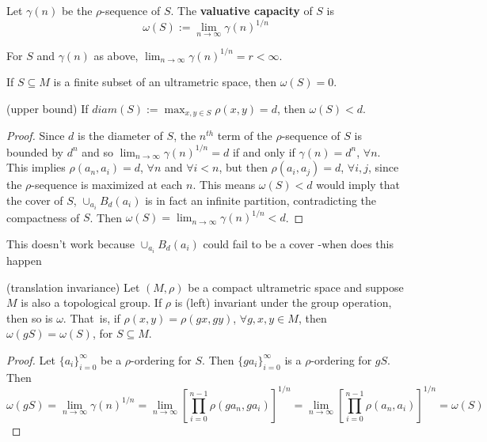 \begin{definition*}
	\cite{kj}  Let $\gamma(n)$ be the $\rho$-sequence of $S$. The \textbf{valuative capacity} of $S$ is \[\omega(S)
	:= \lim_{n\to\infty} \gamma(n)^{1/n}\]  
\end{definition*}


\begin{proposition*}
	\cite{kj} For $S$ and $\gamma(n)$ as above,  $\lim_{n\to\infty} \gamma(n)^{1/n} = r < \infty$. 
\end{proposition*}


\begin{proposition*}
	If $S \subseteq M$ is a finite subset of an ultrametric space, then $\omega(S) =0$.
\end{proposition*}


\begin{proposition*}
	(upper bound) If $diam(S)  := \max_{x,y \in S} \rho(x,y)= d$, then $\omega(S) < d$.
\end{proposition*}

\begin{proof}
	Since $d$ is the diameter of $S$, the $n^{th}$ term of the $\rho$-sequence of $S$ is bounded by $d^n$ and so $ \lim_{n\to\infty} \gamma(n)^{1/n}=d$ if and only if $\gamma(n)=d^n$, $\forall n$. This implies $\rho(a_n, a_i) = d$, $\forall n$ and $\forall i < n$, but then $\rho(a_i,a_j)=d$, $\forall i,j$, since the $\rho$-sequence is maximized at each $n$. This means $\omega(S) < d$ would imply that the cover of $S$, $\cup_{a_i} B_d(a_i)$ is in fact an infinite partition, contradicting the compactness of $S$. Then  $\omega(S)= \lim_{n\to\infty} \gamma(n)^{1/n}<d$. 
\end{proof}

This doesn't work because  $\cup_{a_i} B_d(a_i)$  could fail to be a cover -when does this happen


\begin{proposition*}
	(translation invariance) Let $(M, \rho)$ be a compact ultrametric space and suppose $M$ is also a topological group. If $\rho$ is (left) invariant under the group operation, then so is $\omega$. That\ is, if $\rho(x,y)=\rho(gx,gy)$, $ \forall g,x,y \in M$, then $\omega(gS)=\omega(S)$, for $S \subseteq M$.	
\end{proposition*}

\begin{proof}
	Let $\{a_i\}_{i=0}^\infty$ be a $\rho$-ordering for $S$. Then $\{ga_i\}_{i=0}^\infty$ is a $\rho$-ordering for $gS$. Then $$\omega(gS) = \lim_{n\to\infty} \gamma(n)^{1/n} =  \lim_{n\to\infty} [\prod_{i=0}^{n-1} \rho(ga_n,ga_i)]^{1/n} = \lim_{n\to\infty} [\prod_{i=0}^{n-1} \rho(a_n,a_i)]^{1/n}	 = \omega(S)$$
\end{proof}	

